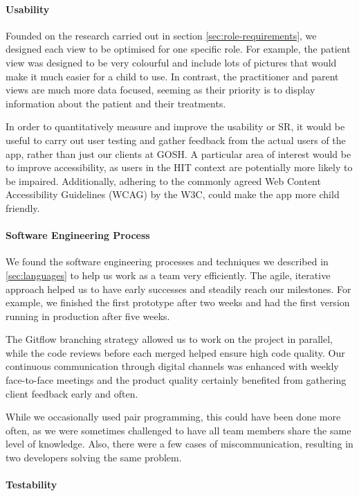 \documentclass[sigconf]{acmart}
\begin{document}
\paragraph{Usability}

Founded on the research carried out in section \ref{sec:role-requirements}, we designed each view to be optimised for one specific role. For example, the patient view was designed to be very colourful and include lots of pictures that would make it much easier for a child to use. In contrast, the practitioner and parent views are much more data focused, seeming as their priority is to display information about the patient and their treatments. 

In order to quantitatively measure and improve the usability or SR, it would be useful to carry out user testing and gather feedback from the actual users of the app, rather than just our clients at GOSH. A particular area of interest would be to improve accessibility, as users in the HIT context are potentially more likely to be impaired. Additionally, adhering to the commonly agreed Web Content Accessibility Guidelines (WCAG) by the W3C, could make the app more child friendly.


\paragraph{Software Engineering Process}

We found the software engineering processes and techniques we described in \ref{sec:languages} to help us work as a team very efficiently. The agile, iterative approach helped us to have early successes and steadily reach our milestones. For example, we finished the first prototype after two weeks and had the first version running in production after five weeks.

The Gitflow branching strategy allowed us to work on the project in parallel, while the code reviews before each merged helped ensure high code quality. Our continuous communication through digital channels was enhanced with weekly face-to-face meetings and the product quality certainly benefited from gathering client feedback early and often.

While we occasionally used pair programming, this could have been done more often, as we were sometimes challenged to have all team members share the same level of knowledge. Also, there were a few cases of miscommunication, resulting in two developers solving the same problem.


\paragraph{Testability}
\end{document}
